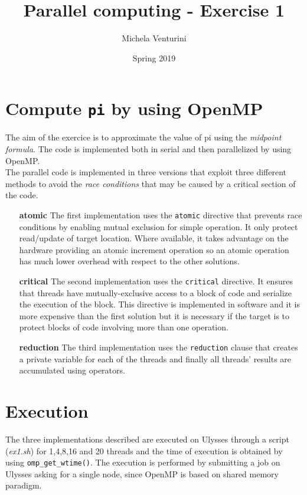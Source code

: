 \documentclass[]{scrartcl}
\title{\textbf{Parallel computing - Exercise 1}}
\author{Michela Venturini}
\date{Spring 2019}
\begin{document}
\maketitle

\section{Compute \texttt{pi} by using OpenMP}
The aim of the exercice is to approximate the value of pi using the \textit{midpoint formula}. The code is implemented both in serial and then parallelized by using OpenMP.\\ The parallel code is implemented in three versions that exploit three different methods to avoid the \textit{race conditions} that may be caused by a critical section of the code.
\begin{itemize}
\item[\textbf{atomic}] The first implementation uses the \texttt{atomic} directive that prevents race conditions by enabling mutual exclusion for simple operation. It only protect read/update of target location. Where available, it takes advantage on the hardware providing an atomic increment operation so an atomic operation has much lower overhead with respect to the other solutions.
\item[\textbf{critical}] The second implementation uses the \texttt{critical} directive. It ensures that threads have mutually-exclusive access to a block of code and serialize the execution of the block. This directive is implemented in software and it is more expensive than the first solution but it is necessary if the target is to protect blocks of code involving more than one operation. 
\item[\textbf{reduction}] The third implementation uses the \texttt{reduction} clause that creates a private variable for each of the threads and finally all threads' results are accumulated using operators.
\end{itemize}

\section{Execution}
The three implementations described are executed on Ulysses through a script (\textit{ex1.sh}) for 1,4,8,16 and 20 threads and the time of execution is obtained by using \texttt{omp\_get\_wtime()}.
The execution is performed by submitting a job on Ulysses asking for a single node, since OpenMP is based on shared memory paradigm.
\end{document}
